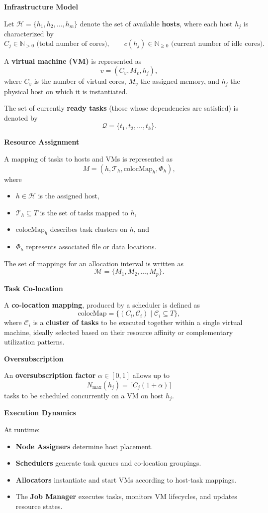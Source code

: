 \textbf{Infrastructure Model}

Let \( \mathcal{H} = \{h_1, h_2, \dots, h_m\} \) denote the set of available \textbf{hosts},
where each host \( h_j \) is characterized by
\[
    C_j \in \mathbb{N}_{>0} \text{ (total number of cores)}, \qquad
    c(h_j) \in \mathbb{N}_{\ge 0} \text{ (current number of idle cores).}
\]

A \textbf{virtual machine (VM)} is represented as
\[
    v = (C_v, M_v, h_j),
\]
where \( C_v \) is the number of virtual cores, \( M_v \) the assigned memory,
and \( h_j \) the physical host on which it is instantiated.

The set of currently \textbf{ready tasks} (those whose dependencies are satisfied) is denoted by
\[
    \mathcal{Q} = \{t_1, t_2, \dots, t_k\}.
\]

\textbf{Resource Assignment}

A mapping of tasks to hosts and VMs is represented as
\[
    M = (h, \mathcal{T}_h, \text{colocMap}_h, \Phi_h),
\]
where
\begin{itemize}
    \item $h \in \mathcal{H}$ is the assigned host,
    \item $\mathcal{T}_h \subseteq T$ is the set of tasks mapped to $h$,
    \item $\text{colocMap}_h$ describes task clusters on $h$, and
    \item $\Phi_h$ represents associated file or data locations.
\end{itemize}
The set of mappings for an allocation interval is written as
\[
    \mathcal{M} = \{ M_1, M_2, \dots, M_p \}.
\]

\textbf{Task Co-location}

A \textbf{co-location mapping}, produced by a scheduler is defined as
\[
    \text{colocMap} = \{ (C_i, \mathcal{C}_i) \mid \mathcal{C}_i \subseteq T \},
\]
where $\mathcal{C}_i$ is a \textbf{cluster of tasks} to be executed together within a single virtual machine, ideally selected based on their resource affinity or complementary utilization patterns.

\textbf{Oversubscription}

An \textbf{oversubscription factor} $\alpha \in [0,1]$ allows up to
\[
    N_{\max}(h_j) = \lceil C_j (1 + \alpha) \rceil
\]
tasks to be scheduled concurrently on a VM on host $h_j$.


\textbf{Execution Dynamics}

At runtime:
\begin{itemize}
    \item \textbf{Node Assigners} determine host placement.
    \item \textbf{Schedulers} generate task queues and co-location groupings.
    \item \textbf{Allocators} instantiate and start VMs according to host-task mappings.
    \item The \textbf{Job Manager} executes tasks, monitors VM lifecycles, and updates resource states.
\end{itemize}


